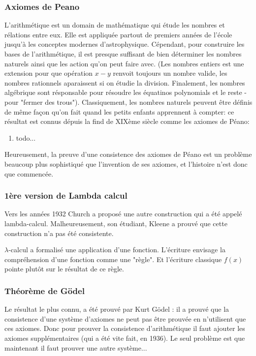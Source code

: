 \documentclass[12pt, a4paper]{article}
\begin{document}
\subsubsection*{Axiomes de Peano}
L'arithmétique est un domain de mathématique qui étude les nombres et rélations entre eux.
Elle est appliquée partout de premiers années de l'école jusqu'à les conceptes modernes d'astrophysique.
Cépendant, pour construire les bases de l'arithmétique, il est presque suffisant de bien déterminer les nombres naturels ainsi que les action qu'on peut faire avec.
(Les nombres entiers est une extension pour que opération $x - y$ renvoit toujours un nombre valide, les nombres rationnels aparaissent si on étudie la division. Finalement, les nombres algébrique sont résponsable pour résoudre les équatinos polynomials et le reste - pour "fermer des trous").
Classiquement, les nombres naturels peuvent être définis de même façon qu'on fait quand les petits enfants apprennent à compter: ce résultat est connus dépuis la find de XIXème siècle comme les axiomes de Péano:
\begin{enumerate}
	\item todo...
\end{enumerate}
Heureusement, la preuve d'une consistence des axiomes de Péano est un problème beaucoup plus sophistiqué que l'invention de ses axiomes, et l'histoire n'est donc que commencée.

\subsubsection*{1ère version de Lambda calcul}
Vers les années 1932 Church a proposé une autre construction qui a été appelé lambda-calcul. Malheureusement, son étudiant, Kleene a prouvé que cette construction n'a pas été consistente.

$\lambda$-calcul a formalisé une application d'une fonction. L'écriture envisage la compréhension d'une fonction comme une "règle". Et l'écriture classique $f(x)$ pointe plutôt sur le résultat de ce règle.

\subsubsection*{Théorème de Gödel}
Le résultat le plus connu, a été prouvé par Kurt Gödel : il a prouvé que la consistence d'une système d'axiomes ne peut pas être prouvée en n'utilisent que ces axiomes. Donc pour prouver la consistence d'arithmétique il faut ajouter les axiomes supplémentaires (qui a été vite fait, en 1936). Le seul problème est que maintenant il faut prouver une autre système...
\end{document}
